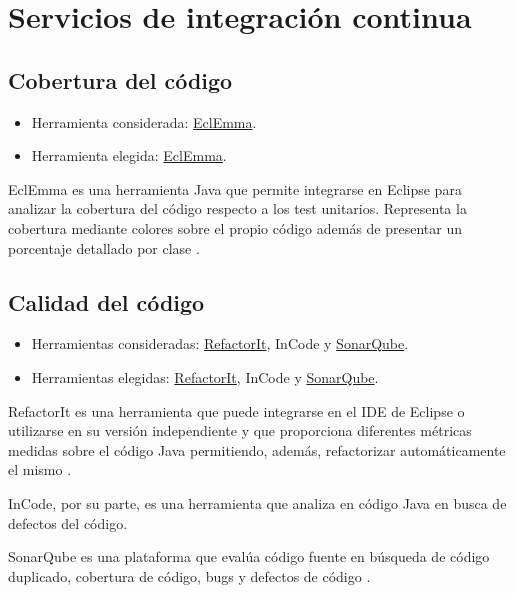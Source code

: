 \section{Servicios de integración continua}

\subsection{Cobertura del código}

\begin{itemize}
\tightlist
\item
  Herramienta considerada: \href{http://www.eclemma.org/}{EclEmma}.
\item
  Herramienta elegida: \href{http://www.eclemma.org/}{EclEmma}.
\end{itemize}

EclEmma es una herramienta Java que permite integrarse en Eclipse para analizar la cobertura del código respecto a los test unitarios. Representa la cobertura mediante colores sobre el propio código además de presentar un porcentaje detallado por clase \cite{eclemma:info}.

\subsection{Calidad del código}

\begin{itemize}
\tightlist
\item
  Herramientas consideradas: \href{https://sourceforge.net/projects/refactorit/}{RefactorIt}, InCode y \href{https://www.sonarqube.org/}{SonarQube}.
\item
  Herramientas elegidas: \href{https://sourceforge.net/projects/refactorit/}{RefactorIt}, InCode y \href{https://www.sonarqube.org/}{SonarQube}.
\end{itemize}

RefactorIt es una herramienta que puede integrarse en el IDE de Eclipse o utilizarse en su versión independiente y que proporciona diferentes métricas medidas sobre el código Java permitiendo, además, refactorizar automáticamente el mismo \cite{refacit:source}.

InCode, por su parte, es una herramienta que analiza en código Java en busca de defectos del código.

SonarQube es una plataforma que evalúa código fuente en búsqueda de código duplicado, cobertura de código, bugs y defectos de código \cite{wiki:sonar}.

